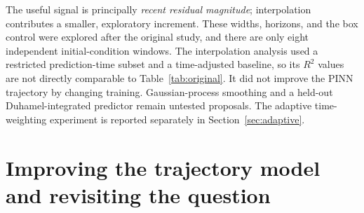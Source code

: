 \documentclass[11pt,a4paper]{article}
\begin{document}
The useful signal is principally \emph{recent residual magnitude}; interpolation contributes a smaller, exploratory increment. These widths, horizons, and the box control were explored after the original study, and there are only eight independent initial-condition windows. The interpolation analysis used a restricted prediction-time subset and a time-adjusted baseline, so its $R^2$ values are not directly comparable to Table~\ref{tab:original}. It did not improve the PINN trajectory by changing training. Gaussian-process smoothing and a held-out Duhamel-integrated predictor remain untested proposals. The adaptive time-weighting experiment is reported separately in Section~\ref{sec:adaptive}.

\section{Improving the trajectory model and revisiting the question}
\end{document}
